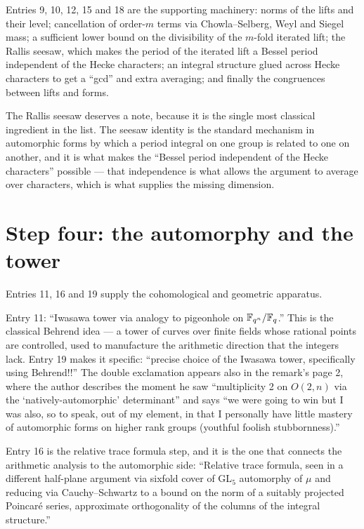 Entries 9, 10, 12, 15 and 18 are the supporting machinery: norms of the lifts
and their level; cancellation of order-$m$ terms via Chowla--Selberg, Weyl and
Siegel mass; a sufficient lower bound on the divisibility of the $m$-fold
iterated lift; the Rallis seesaw, which makes the period of the iterated lift a
Bessel period independent of the Hecke characters; an integral structure glued
across Hecke characters to get a ``gcd'' and extra averaging; and finally the
congruences between lifts and forms.

The Rallis seesaw deserves a note, because it is the single most classical
ingredient in the list. The seesaw identity is the standard mechanism in
automorphic forms by which a period integral on one group is related to one on
another, and it is what makes the ``Bessel period independent of the Hecke
characters'' possible --- that independence is what allows the argument to
average over characters, which is what supplies the missing dimension.

\section{Step four: the automorphy and the tower}Entries 11, 16 and 19 supply the cohomological and geometric apparatus.

Entry 11: ``Iwasawa tower via analogy to pigeonhole on $\mathbb{F}_{q^n}/\mathbb{F}_q$.''
This is the classical Behrend idea --- a tower of curves over finite fields
whose rational points are controlled, used to manufacture the arithmetic
direction that the integers lack. Entry 19 makes it specific: ``precise choice
of the Iwasawa tower, specifically using Behrend!!'' The double exclamation
appears also in the remark's page 2, where the author describes the moment he
saw ``multiplicity 2 on $O(2,n)$ via the `natively-automorphic' determinant''
and says ``we were going to win but I was also, so to speak, out of my
element, in that I personally have little mastery of automorphic forms on
higher rank groups (youthful foolish stubbornness).''

Entry 16 is the relative trace formula step, and it is the one that connects
the arithmetic analysis to the automorphic side: ``Relative trace formula, seen
in a different half-plane argument via sixfold cover of GL$_5$ automorphy of
$\mu$ and reducing via Cauchy--Schwartz to a bound on the norm of a suitably
projected Poincar\'e series, approximate orthogonality of the columns of the
integral structure.''

